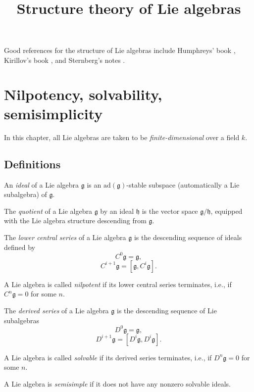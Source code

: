 

%


\title{Structure theory of Lie algebras}


\maketitle

\label{section-phantom}

\tableofcontents

Good references for the structure of Lie algebras include Humphreys' book \cite{Humphreys-Lie}, Kirillov's book \cite{Kirillov-Lie}, and Sternberg's notes \cite{Sternberg}.

\section{Nilpotency, solvability, semisimplicity}
\label{section-nilpotent-solvable}


In this chapter, all Lie algebras are taken to be \emph{finite-dimensional} over a field $k$.

\subsection{Definitions}
\label{subsection-definitions-nilpotent-solvable}

\begin{definition}
 \label{definition-ideal}
An {\it ideal} of a Lie algebra $\mathfrak g$ is an $\text{ad}(\mathfrak g)$-stable subspace (automatically a Lie subalgebra) of $\mathfrak g$.

The {\it quotient} of a Lie algebra $\mathfrak g$ by an ideal $\mathfrak h$ is the vector space $\mathfrak g/\mathfrak h$, equipped with the Lie algebra structure descending from $\mathfrak g$.
\end{definition}



\begin{definition}
 \label{definition-nilpotent-solvable-semisimple}
The {\it lower central series} of a Lie algebra $\mathfrak g$ is the descending sequence of ideals defined by
$$ C^0\mathfrak g = \mathfrak g,$$
$$ C^{i+1}\mathfrak g = [\mathfrak g, C^i\mathfrak g].$$
 
 
A Lie algebra is called {\it nilpotent} if its lower central series terminates, i.e., if $C^n\mathfrak g=0$ for some $n$.


The {\it derived series} of a Lie algebra $\mathfrak g$ is the descending sequence of Lie subalgebras
$$ D^0\mathfrak g = \mathfrak g,$$
$$ D^{i+1}\mathfrak g = [D^i\mathfrak g, D^i\mathfrak g].$$

A Lie algebra is called {\it solvable} if its derived series terminates, i.e., if $D^n\mathfrak g=0$ for some $n$.

A Lie algebra is {\it semisimple} if it does not have any nonzero solvable ideals.
\end{definition}

